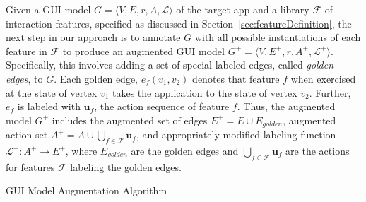 \label{sec:modelAugmentation}

Given a GUI model $G = \langle V, E, r, A, \mathcal{L} \rangle$ of the target app and a library $\mathcal{F}$ of interaction features, specified as discussed in Section~\ref{sec:featureDefinition}, the next step in our approach is to annotate $G$ with all possible instantiations of each feature in $\mathcal{F}$ to produce an augmented GUI model $G^+ = \langle V, E^+, r, A^+, \mathcal{L}^+ \rangle$. Specifically, this involves adding a set of special labeled edges, called \textit{golden edges}, to $G$. Each golden edge, $e_f(v_1, v_2)$ denotes that feature $f$ when exercised at the state of vertex $v_1$ takes the application to the state of vertex $v_2$. Further, $e_f$ is labeled with $\mathbf{u}_f$, the action sequence of feature $f$. Thus, the augmented model $G^+$ includes the augmented set of edges $E^+ = E \cup E_{golden}$,  augmented action set $A^+ = A \cup \bigcup_{f \in \mathcal{F}} \mathbf{u}_f$, and appropriately modified labeling function $\mathcal{L}^+: A^+ \rightarrow E^+$, where $E_{golden}$ are the golden edges and $\bigcup_{f \in \mathcal{F}} \mathbf{u}_f$ are the actions for features $\mathcal{F}$ labeling the golden edges.

\begin{algorithm}[t]
\begin{footnotesize}
  \DontPrintSemicolon
  \SetAlFnt{\scriptsize\scriptfont}
  \caption{GUI Model Augmentation Algorithm}\label{alg:augmentGUImodel}
  \BlankLine
\end{footnotesize}  
\end{algorithm}

